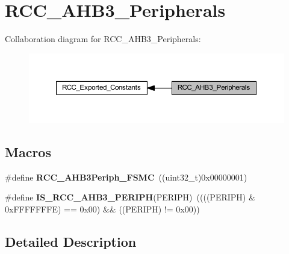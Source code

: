 \hypertarget{group___r_c_c___a_h_b3___peripherals}{}\section{R\+C\+C\+\_\+\+A\+H\+B3\+\_\+\+Peripherals}
\label{group___r_c_c___a_h_b3___peripherals}
Collaboration diagram for R\+C\+C\+\_\+\+A\+H\+B3\+\_\+\+Peripherals\+:
\nopagebreak
\begin{figure}[H]
\begin{center}
\leavevmode
\includegraphics[width=350pt]{group___r_c_c___a_h_b3___peripherals}
\end{center}
\end{figure}
\subsection*{Macros}
\begin{DoxyCompactItemize}
\item 
\mbox{\label{group___r_c_c___a_h_b3___peripherals_gaa305538e5105917baf53039c5643a361}} 
\#define {\bfseries R\+C\+C\+\_\+\+A\+H\+B3\+Periph\+\_\+\+F\+S\+MC}~((uint32\+\_\+t)0x00000001)
\item 
\mbox{\label{group___r_c_c___a_h_b3___peripherals_ga8d269d2fbf78cf494ea127d1a6daec31}} 
\#define {\bfseries I\+S\+\_\+\+R\+C\+C\+\_\+\+A\+H\+B3\+\_\+\+P\+E\+R\+I\+PH}(P\+E\+R\+I\+PH)~((((P\+E\+R\+I\+PH) \& 0x\+F\+F\+F\+F\+F\+F\+F\+E) == 0x00) \&\& ((\+P\+E\+R\+I\+P\+H) != 0x00))
\end{DoxyCompactItemize}


\subsection{Detailed Description}
